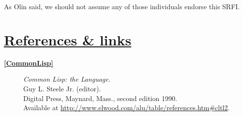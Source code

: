 As Olin said, we should not assume any of those individuals endorse this
SRFI.

\section{\texorpdfstring{\href{}{References \&
links}}{References \& links}}\label{references-links}

\begin{description}
\item[\textbf{\href{}{{[}CommonLisp{]}}}]
\emph{Common Lisp: the Language.}\\
Guy L. Steele Jr. (editor).\\
Digital Press, Maynard, Mass., second edition 1990.\\
Available at
\url{http://www.elwood.com/alu/table/references.htm\#cltl2}.


\end{description}
